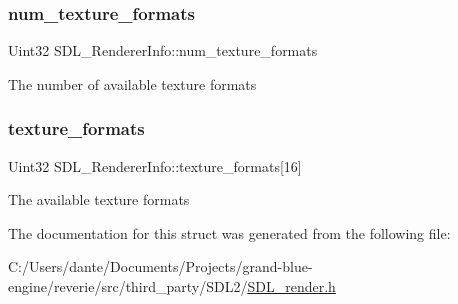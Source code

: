 \subsubsection{\texorpdfstring{num\_texture\_formats}{num\_texture\_formats}}
{\footnotesize\ttfamily Uint32 S\+D\+L\+\_\+\+Renderer\+Info\+::num\+\_\+texture\+\_\+formats}

The number of available texture formats \mbox{\label{struct_s_d_l___renderer_info_a88450f9d48e593ec4571e3ba7cc3427d}} 
\subsubsection{\texorpdfstring{texture\_formats}{texture\_formats}}
{\footnotesize\ttfamily Uint32 S\+D\+L\+\_\+\+Renderer\+Info\+::texture\+\_\+formats\mbox{[}16\mbox{]}}

The available texture formats 

The documentation for this struct was generated from the following file\+:\begin{DoxyCompactItemize}
\item 
C\+:/\+Users/dante/\+Documents/\+Projects/grand-\/blue-\/engine/reverie/src/third\+\_\+party/\+S\+D\+L2/\mbox{\hyperlink{_s_d_l__render_8h}{S\+D\+L\+\_\+render.\+h}}\end{DoxyCompactItemize}
